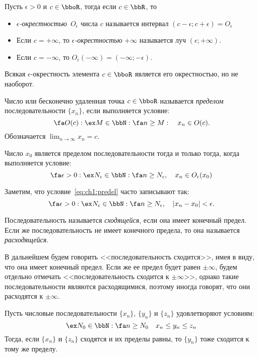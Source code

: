 \begin{defn}
Пусть $\epsilon > 0$ и $c \in \bboR $, тогда если $c \in \bbR$, то
\begin{itemize}
\item
\textit{$\epsilon$-окрестностью}~$O_\epsilon$ числа $c$ называется интервал $(c-\epsilon;c+\epsilon) = O_\epsilon$
\item
Если $c=+\infty$, то \textit{$\epsilon$-окрестностью} $+\infty$ называется луч $(\epsilon;+\infty)$.
\item
Если $c=-\infty$, то $O_\epsilon(-\infty)=(-\infty;-\epsilon)$.
\end{itemize}
\end{defn}
Всякая $\epsilon$-окрестность элемента $c \in \bboR$ является его окрестностью, но не наоборот.

\begin{defn}
Число или бесконечно удаленная точка $c \in \bboR$ называется \textit{пределом} последовательности $\{x_n\}$, если выполняется условие:
$$
\fa O(c): \ex M \in \bbN: \fa n \ge M:\quad x_n \in O(c).
$$
Обозначается $\lim_{n \to \infty}\limits x_n = c$.
\end{defn}

\begin{lemm}
Число $x_0$ является пределом последовательности тогда и только тогда, когда выполняется условие:
\begin{equation}
\label{eq:ch1:predel}
\fa \epsilon>0: \ex N_\epsilon \in \bbN: \fa n \ge N_\epsilon,\quad x_n \in O_\epsilon(x_0)
\end{equation}
\end{lemm}
Заметим, что условие~\eqref{eq:ch1:predel} часто записывают так:
$$
\fa \epsilon>0: \ex N_\epsilon \in \bbN: \fa n \ge N_\epsilon,\quad |x_n-x_0|<\epsilon.
$$
\begin{defn}
Последовательность называется \textit{сходящейся}, если она имеет конечный предел. Если же последовательность не имеет конечного предела, то она называется \textit{расходящейся}.
\end{defn}
В дальнейшем будем говорить <<последовательность сходится>>, имея в виду, что она имеет конечный предел. Если же ее предел будет равен $\pm\infty$, будем отдельно отмечать <<последовательность сходится к $\pm\infty$>>, однако такие последовательности являются расходящимися, поэтому иногда говорят, что они расходятся к $\pm\infty$. 
\begin{thm} \label{th:ch1:otrehposled}  
Пусть числовые последовательности $\{x_n\}$, $\{y_n\}$ и $\{z_n\}$ удовлетворяют условиям:
$$
\ex N_0 \in \bbN:\fa n\ge N_0 \quad x_n \le y_n \le z_n 
$$
Тогда, если $\{x_n\}$ и $\{z_n\}$ сходятся и их пределы равны, то $\{y_n\}$ тоже сходится к тому же пределу.
\end{thm}

